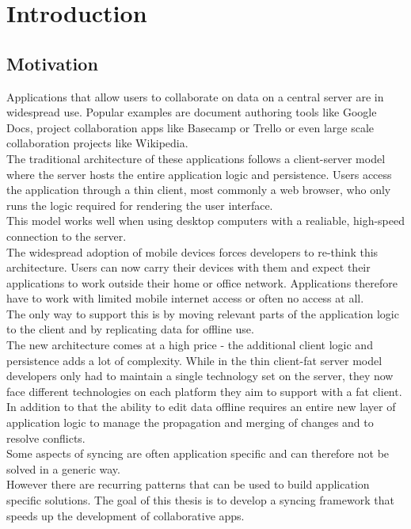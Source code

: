
\chapter{Introduction}\label{intro}

\section{Motivation}
Applications that allow users to collaborate on data on a central server are in widespread use. Popular examples are document authoring tools like Google Docs, project collaboration apps like Basecamp or Trello or even large scale collaboration projects like Wikipedia.\\
The traditional architecture of these applications follows a client-server model where the server hosts the entire application logic and persistence. Users access the application through a thin client, most commonly a web browser, who only runs the logic required for rendering the user interface.\\
This model works well when using desktop computers with a realiable, high-speed connection to the server.\\
The widespread adoption of mobile devices forces developers to re-think this architecture. Users can now carry their devices with them and expect their applications to work outside their home or office network.
Applications therefore have to work with limited mobile internet access or often no access at all.\\
The only way to support this is by moving relevant parts of the application logic to the client and by replicating data for offline use.\\
The new architecture comes at a high price - the additional client logic and persistence adds a lot of complexity. While in the thin client-fat server model developers only had to maintain a single technology set on the server, they now face different technologies on each platform they aim to support with a fat client.\\
In addition to that the ability to edit data offline requires an entire new layer of application logic to manage the propagation and merging of changes and to resolve conflicts.\\

Some aspects
of syncing are often application specific and can therefore not be
solved in a generic way.\\However there are recurring patterns that can
be used to build application specific solutions. The goal of this thesis
is to develop a syncing framework that speeds up the development of
collaborative apps.

